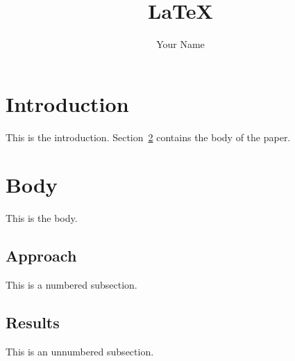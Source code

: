 \documentclass[12pt]{article}
\title{\LaTeX}
\author{Your Name}
\begin{document}
  \maketitle
  \section{Introduction}
  This is the introduction.  Section~\ref{sec:body} contains the body of the paper.
  \section{Body}
  \label{sec:body}
  This is the body.
    \subsection{Approach}
    This is a numbered subsection.
    \subsection*{Results}
    This is an unnumbered subsection.
\end{document}
